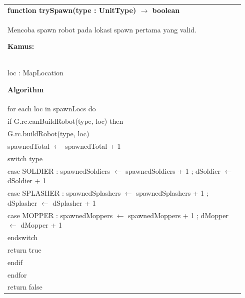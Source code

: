 \documentclass{article}
\newenvironment{pseudobox}
{
\centering
\begin{longtable}{|p{0.94\linewidth}|}
\hline
}
{
\\ \hline
\end{longtable}
\vspace{0.05cm}
}
\begin{document}
\begin{pseudobox}
\textbf{function trySpawn(type : UnitType) $\rightarrow$ boolean} \\
{ Mencoba spawn robot pada lokasi spawn pertama yang valid. }

\textbf{Kamus:} \\
\hspace*{1em} loc : MapLocation

\textbf{Algorithm} \\
\hspace*{1em} for each loc in spawnLocs do \\
\hspace*{2em} if G.rc.canBuildRobot(type, loc) then \\
\hspace*{3em} G.rc.buildRobot(type, loc) \\
\hspace*{3em} spawnedTotal $\leftarrow$ spawnedTotal + 1 \\

\hspace*{3em} switch type \\
\hspace*{4em} case SOLDIER  : spawnedSoldiers $\leftarrow$ spawnedSoldiers + 1 ; dSoldier $\leftarrow$ dSoldier + 1 \\
\hspace*{4em} case SPLASHER : spawnedSplashers $\leftarrow$ spawnedSplashers + 1 ; dSplasher $\leftarrow$ dSplasher + 1 \\
\hspace*{4em} case MOPPER   : spawnedMoppers $\leftarrow$ spawnedMoppers + 1 ; dMopper $\leftarrow$ dMopper + 1 \\
\hspace*{3em} endswitch \\

\hspace*{3em} return true \\
\hspace*{2em} endif \\
\hspace*{1em} endfor \\

\hspace*{1em} return false
\end{pseudobox}
\end{document}
